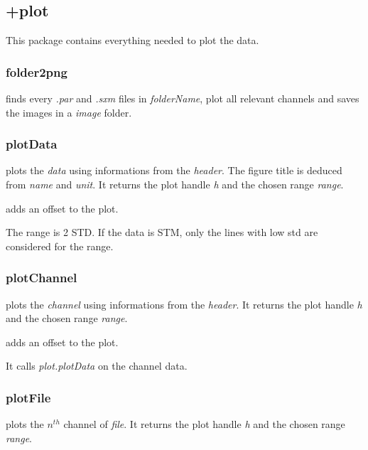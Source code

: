 \subsection{+plot}
This package contains everything needed to plot the data.

\subsubsection{folder2png} 
\bdf
{} finds every \emph{.par} and \emph{.sxm} files in \emph{folderName}, plot all relevant channels and saves the images in a \emph{image} folder.
\edf
\subsubsection{plotData}
\bdf
{} plots the \emph{data} using informations from the \emph{header}. The figure title is deduced from \emph{name} and \emph{unit}. It returns the plot handle \emph{h} and the chosen range \emph{range}.
 
 adds an offset to the plot.
\edf

The range is 2 STD. If the data is STM, only the lines with low std are considered for the range.
\subsubsection{plotChannel}
\bdf
{} plots the \emph{channel} using informations from the \emph{header}. It returns the plot handle \emph{h} and the chosen range \emph{range}.

 adds an offset to the plot.
\edf

It calls \emph{plot.plotData} on the channel data.
\subsubsection{plotFile}

\bdf
{} plots the $n^{th}$ channel of \emph{file}. It returns the plot handle \emph{h} and the chosen range \emph{range}.


